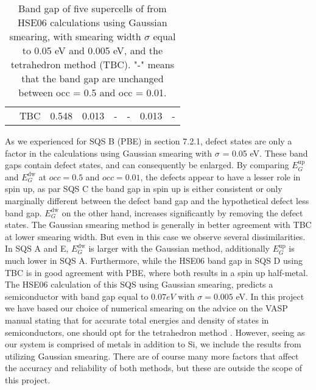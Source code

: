 \begin{landscape}
\begin{table}[]
\begin{tabular}{@{}cccccccc@{}}
\multicolumn{1}{c|}{}                            & TBC                                                           & 0.548                                                                        & 0.013                                                                        & -                                                                              & -                                                                              & 0.013                                                                         & -                                                                                     \\ \cmidrule(l){2-8} 
\end{tabular}
\caption{Band gap of five supercells of  from HSE06 calculations using Gaussian smearing, with smearing width $\sigma$ equal to 0.05 eV and 0.005 eV, and the tetrahedron method (TBC). "-"  means that the band gap are unchanged between occ = 0.5 and occ = 0.01.}
\end{table}
\end{landscape}
\newpage

As we experienced for SQS B (PBE) in section 7.2.1, defect states are only a factor in the calculations using Gaussian smearing with $\sigma$ = 0.05 eV. These band gaps contain defect states, and can consequently be enlarged. By comparing $E_G ^\text{up}$ and $E_G ^\text{dw}$ at $occ = 0.5$ and $occ = 0.01$, the defects appear to have a lesser role in spin up, as par SQS C the band gap in spin up is either consistent or only marginally different between the defect band gap and the hypothetical defect less band gap. $E_G ^\text{dw}$ on the other hand, increases significantly by removing the defect states. The Gaussian smearing method is generally in better agreement with TBC at lower smearing width. But even in this case we observe several dissimilarities. In SQS A and E, $E_G ^\text{dw}$ is larger with the Gaussian method, additionally $E_G ^\text{up}$ is much lower in SQS A. Furthermore, while the HSE06 band gap in SQS D using TBC is in good agreement with PBE, where both results in a spin up half-metal. The HSE06 calculation of this SQS using Gaussian smearing, predicts a semiconductor with band gap equal to $0.07 eV$ with $\sigma = 0.005$ eV. In this project we have based our choice of numerical smearing on the advice on the VASP manual stating that for accurate total energies and density of states in semiconductors, one should opt for the tetrahedron method \cite{ismear}.  However, seeing as our system is comprised of metals in addition to Si, we include the results from utilizing Gaussian smearing. There are of course many more factors that affect the accuracy and reliability of both methods, but these are outside the scope of this project.

